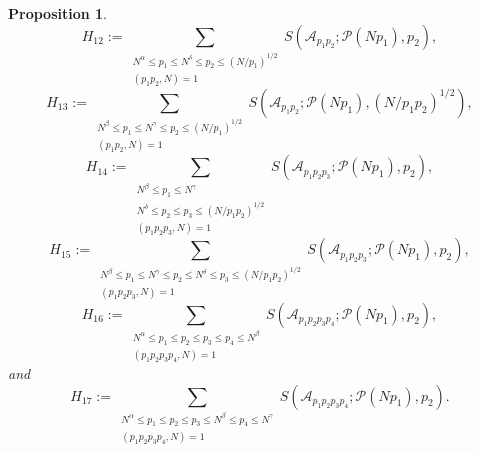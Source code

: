\documentclass[10pt,a4paper]{amsart}
\newtheorem{proposition}{Proposition}
\def \N {{\mathbb N}}
\def\le{\leqslant}
\def\leq{\leqslant}
\begin{document}
\begin{proposition}
\[\] 
\[
H_{12} := \sum_{\substack{N^{\alpha} \leq p_1 \le N^{\delta}\leq p_2 \le (N/p_1)^{1/2} \\ (p_1 p_2, N) = 1}} S(\mathscr{A}_{p_1 p_2}; \mathscr{P}(N p_1), p_2),
\] 
\[
H_{13} := \sum_{\substack{N^{\beta} \leq p_1 \le N^{\gamma} \leq p_2 \le (N/p_1)^{1/2} \\ (p_1 p_2, N) = 1}} S(\mathscr{A}_{p_1 p_2}; \mathscr{P}(N p_1), (N/p_1 p_2)^{1/2}),
\]
\[
H_{14} := \sum_{\substack{N^\beta \le p_1\le N^{\gamma}\\N^\delta \le p_2\le p_3\le (N/p_1p_2)^{1/2} \\ (p_1 p_2 p_3, N) = 1}}  S(\mathscr{A}_{p_1 p_2 p_3}; \mathscr{P}(Np_1), p_2),
\]
\[ 
H_{15} := \sum_{\substack{N^\beta \le p_1\le N^\gamma \le p_2\le N^{\delta}\le p_3\le (N/p_1p_2)^{1/2} \\ (p_1 p_2 p_3, N) = 1}}  S(\mathscr{A}_{p_1 p_2 p_3}; \mathscr{P}(Np_1), p_2),
\]
\[
H_{16} := \sum_{\substack{N^{\alpha} \leq p_1 \le p_2 \le p_3 \le p_4 \le N^{\beta} \\ (p_1 p_2 p_3 p_4, N) = 1}} S(\mathscr{A}_{p_1 p_2 p_3 p_4}; \mathscr{P}(Np_1), p_2),
\]
and 
\[
H_{17} := \sum_{\substack{N^{\alpha} \leq p_1 \le p_2 \le p_3 \le N^{\beta} \leq p_4 \le N^{\gamma}\\ (p_1 p_2 p_3 p_4, N) = 1}} S(\mathscr{A}_{p_1 p_2 p_3 p_4}; \mathscr{P}(Np_1), p_2).
\] 
\end{proposition}
\end{document}
